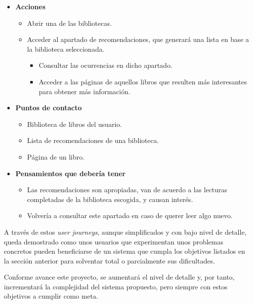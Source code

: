 \begin{itemize}
    \item \textbf{Acciones}
    \begin{itemize}
        \item Abrir una de las bibliotecas.
        \item Acceder al apartado de recomendaciones, que generará una lista en base a la biblioteca seleccionada.
        \begin{itemize}
            \item Consultar las ocurrencias en dicho apartado.
            \item Acceder a las páginas de aquellos libros que resulten más interesantes para obtener más información.
        \end{itemize}
    \end{itemize}
    \item \textbf{Puntos de contacto}
    \begin{itemize}
        \item Biblioteca de libros del usuario.
        \item Lista de recomendaciones de una biblioteca.
        \item Página de un libro.
    \end{itemize}
    \item \textbf{Pensamientos que debería tener}
    \begin{itemize}
        \item Las recomendaciones son apropiadas, van de acuerdo a las lecturas completadas de la biblioteca escogida, y causan interés.
        \item Volvería a consultar este apartado en caso de querer leer algo nuevo.
    \end{itemize}
\end{itemize}

A través de estos \textit{user journeys}, aunque simplificados y con bajo nivel de detalle, queda demostrado como unos usuarios que experimentan unos problemas concretos pueden beneficiarse de un sistema que cumpla los objetivos listados en la sección anterior para solventar total o parcialmente sus dificultades.

Conforme avance este proyecto, se aumentará el nivel de detalle y, por tanto, incrementará la complejidad del sistema propuesto, pero siempre con estos objetivos a cumplir como meta.